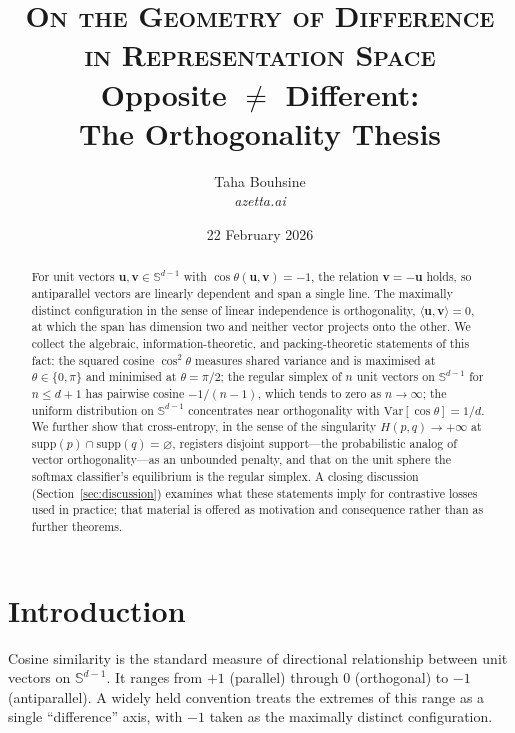 \documentclass[11pt,a4paper]{article}
\title{%
  \vspace{-1cm}
  {\Large\scshape On the Geometry of Difference in Representation Space}\\[0.6em]
  \textbf{Opposite $\neq$ Different:\\
  The Orthogonality Thesis}
}
\author{Taha Bouhsine\\[0.3em]{\normalsize\textit{azetta.ai}}}
\date{22 February 2026}
\theoremstyle{remark}
\begin{document}
\maketitle

\begin{abstract}
For unit vectors $\mathbf{u}, \mathbf{v} \in \mathbb{S}^{d-1}$ with $\cos\theta(\mathbf{u}, \mathbf{v}) = -1$, the relation $\mathbf{v} = -\mathbf{u}$ holds, so antiparallel vectors are linearly dependent and span a single line.
The maximally distinct configuration in the sense of linear independence is orthogonality, $\langle\mathbf{u}, \mathbf{v}\rangle = 0$, at which the span has dimension two and neither vector projects onto the other.
We collect the algebraic, information-theoretic, and packing-theoretic statements of this fact: the squared cosine $\cos^2\theta$ measures shared variance and is maximised at $\theta \in \{0, \pi\}$ and minimised at $\theta = \pi/2$; the regular simplex of $n$ unit vectors on $\mathbb{S}^{d-1}$ for $n \le d+1$ has pairwise cosine $-1/(n-1)$, which tends to zero as $n \to \infty$; the uniform distribution on $\mathbb{S}^{d-1}$ concentrates near orthogonality with $\mathrm{Var}[\cos\theta] = 1/d$.
We further show that cross-entropy, in the sense of the singularity $H(p,q) \to +\infty$ at $\mathrm{supp}(p) \cap \mathrm{supp}(q) = \varnothing$, registers disjoint support---the probabilistic analog of vector orthogonality---as an unbounded penalty, and that on the unit sphere the softmax classifier's equilibrium is the regular simplex.
A closing discussion (Section~\ref{sec:discussion}) examines what these statements imply for contrastive losses used in practice; that material is offered as motivation and consequence rather than as further theorems.
\end{abstract}

\tableofcontents
\vspace{1em}

\section{Introduction}
\label{sec:intro}

Cosine similarity is the standard measure of directional relationship between unit vectors on $\mathbb{S}^{d-1}$.
It ranges from $+1$ (parallel) through $0$ (orthogonal) to $-1$ (antiparallel).
A widely held convention treats the extremes of this range as a single ``difference'' axis, with $-1$ taken as the maximally distinct configuration.
\end{document}

